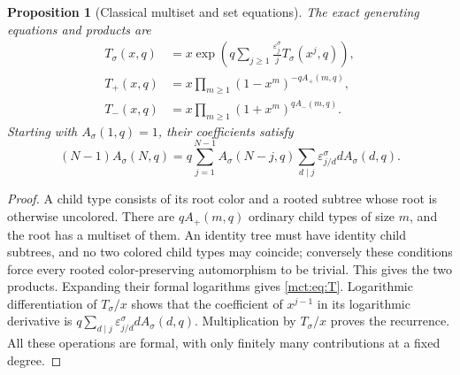 \documentclass[11pt]{article}
\newtheorem{proposition}[theorem]{Proposition}
\theoremstyle{definition}
\newcommand{\eps}{\varepsilon}
\begin{document}
\begin{proposition}[Classical multiset and set equations]\label{mct:prop:recurrence}
The exact generating equations and products are
\begin{align}
 T_\sigma(x,q)&=x\exp\left(q\sum_{j\ge1}\frac{\eps_j^\sigma}{j}T_\sigma(x^j,q)\right),\label{mct:eq:T}\\
 T_+(x,q)&=x\prod_{m\ge1}(1-x^m)^{-qA_+(m,q)},\label{mct:eq:mset}\\
 T_-(x,q)&=x\prod_{m\ge1}(1+x^m)^{qA_-(m,q)}.\label{mct:eq:pset}
\end{align}
Starting with $A_\sigma(1,q)=1$, their coefficients satisfy
\begin{equation}\label{mct:eq:recurrence}
 (N-1)A_\sigma(N,q)=q\sum_{j=1}^{N-1}A_\sigma(N-j,q)
       \sum_{d\mid j}\eps_{j/d}^\sigma d A_\sigma(d,q).
\end{equation}
\end{proposition}
\begin{proof}
A child type consists of its root color and a rooted subtree whose root is otherwise uncolored. There are $qA_+(m,q)$ ordinary child types of size $m$, and the root has a multiset of them. An identity tree must have identity child subtrees, and no two colored child types may coincide; conversely these conditions force every rooted color-preserving automorphism to be trivial. This gives the two products. Expanding their formal logarithms gives \eqref{mct:eq:T}. Logarithmic differentiation of $T_\sigma/x$ shows that the coefficient of $x^{j-1}$ in its logarithmic derivative is $q\sum_{d\mid j}\eps_{j/d}^\sigma dA_\sigma(d,q)$. Multiplication by $T_\sigma/x$ proves the recurrence. All these operations are formal, with only finitely many contributions at a fixed degree.
\end{proof}
\end{document}
